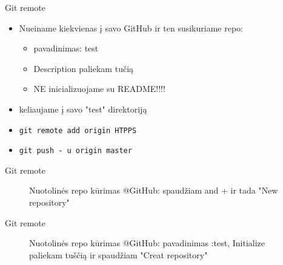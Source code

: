 \documentclass[11pt,xcolor=table]{beamer}
\begin{document}

\begin{frame}{Git remote}
\begin{itemize}
\item Nueiname kiekvienas į savo GitHub ir ten susikuriame repo:
\begin{itemize}
\item pavadinimas: test
\item Description paliekam tučią
\item NE inicializuojame su README!!!!
\end{itemize}
\item keliaujame į savo "test" direktoriją
\item \colorbox{listinggray}{\lstinline|git remote add origin HTPPS|}
\item \colorbox{listinggray}{\lstinline|git push - u origin master|}
\end{itemize}
\end{frame}

\begin{frame}{Git remote}
\begin{figure}
\caption{Nuotolinės repo kūrimas @GitHub: spaudžiam and + ir tada "New repository"}
\end{figure}
\end{frame}

\begin{frame}{Git remote}
\begin{figure}
\caption{Nuotolinės repo kūrimas @GitHub: pavadinimas :test, Initialize paliekam tuščią ir spaudžiam "Creat repository"}
\end{figure}
\end{frame}
\end{document}
